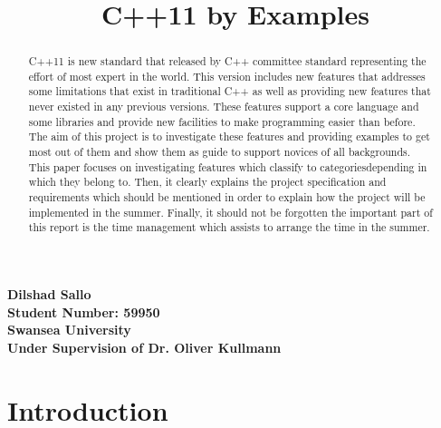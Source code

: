 \documentclass[12pt,a4paper]{report}
\title{{\Huge C++11 by Examples}}
\date{}
\begin{document}
\maketitle

\begin{center}
\textbf{Dilshad Sallo \\Student Number: 59950\\ Swansea University \\ Under Supervision of Dr. Oliver Kullmann}
\end{center}


\begin{abstract}
\label{Abstract}
C++11 is new standard that released by C++ committee standard representing the effort of most expert in the world. This version includes new features that addresses some limitations that exist in traditional C++ as well as providing new features that never existed in any previous versions. These features support a core language and some libraries and  provide new facilities  to make programming easier than before.\\
The aim of this project is to investigate these features and providing examples to get most out of them and show them as guide to support  novices of all backgrounds.\\
This paper focuses on investigating  features which classify to categories\linebreak depending in which they belong to. Then, it clearly explains the project  specification and requirements which should be mentioned in order to explain how the project will be implemented in the summer. Finally, it should not be forgotten the important part of this report is the time management which assists to arrange the time in the summer.
\end{abstract}

\newpage
\tableofcontents
\newpage

\chapter{Introduction}
\end{document}
